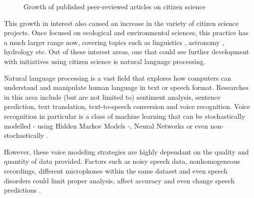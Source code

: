 \begin{figure}[!h]
    \centering
    \caption{Growth of published peer-reviewed articles on citizen science}
    \label{fig:growth-publications}
\end{figure}

This growth in interest also caused an increase in the variety of citizen science projects. Once focused on ecological and environmental sciences, this practice has a much larger range now, covering topics such as linguistics \cite{svendsen2018dynamics}, astronomy \cite{marshall2015ideas}, hydrology \cite{buytaert2014citizen} etc.
Out of these interest areas, one that could see further development with initiatives using citizen science is natural language processing.

Natural language processing is a vast field that explores how computers can understand and manipulate human language in text or speech format. Researches in this area include (but are not limited to) sentiment analysis, sentence prediction, text translation, text-to-speech conversion and voice recognition. Voice recognition in particular is a class of machine learning that can be stochastically modelled - using Hidden Markov Models \cite{gales2008application} -, Neural Networks \cite{graves2013speech} or even non-stochastically \cite{burget2003nonrandomattr}.

However, these voice modeling strategies are highly dependant on the quality and quantity of data provided. Factors such as noisy speech data, nonhomogeneous recordings, different microphones within the same dataset and even speech disorders could limit proper analysis, affect accuracy and even change speech predictions \cite{wrong}. 

